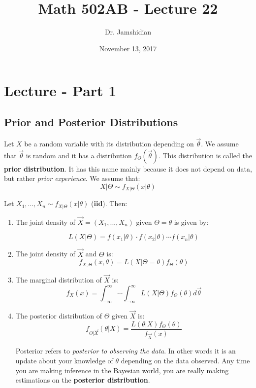 \documentclass{article}
\title{Math 502AB - Lecture 22}
\author{Dr. Jamshidian}
\date{November 13, 2017}
\begin{document}
\maketitle

\section{Lecture - Part 1}

\subsection{Prior and Posterior Distributions}

Let $X$ be a random variable with its distribution depending on $\vec{\theta}$. We assume that $\vec{\theta}$ is random and it has a distribution $f_{\Theta}(\vec{\theta})$. This distribution is called the \textbf{prior distribution}. It has this name mainly because it does not depend on data, but rather \textit{prior experience}. We assume that:
\begin{equation*}
    X|\Theta \sim f_{X|\Theta}(x|\theta)
\end{equation*}

\noindent Let $X_1,...,X_n\sim f_{X|\Theta}(x|\theta)$ (\textbf{iid}). Then:
\begin{enumerate}
    \item The joint density of $\vec{X} = (X_1,...,X_n)$ given $\Theta = \theta$ is given by:

\begin{equation*}
    L(X|\Theta) = f(x_1|\theta)\cdot f(x_2|\theta)\cdots f(x_n|\theta)
\end{equation*}

    \item The joint density of $\vec{X}$ and $\Theta$ is:
        \begin{equation*}
            f_{X,\Theta}(x,\theta) = L(X|\Theta = \theta)f_\Theta(\theta)
        \end{equation*}

    \item The marginal distribution of $\vec{X}$ is:
    \begin{equation*}
        f_X(x) = \int_{-\infty}^\infty\cdots\int_{-\infty}^\infty L(X|\Theta)f_\Theta(\theta) d\vec{\theta}
    \end{equation*}

    \item The posterior distribution of $\Theta$ given $\vec{X}$ is:
    \begin{equation*}
        f_{\Theta|\vec{X}}(\theta|X) = \frac{L(\theta|X)f_\Theta(\theta)}{f_{\vec{X}}(x)}
    \end{equation*}

    Posterior refers to \textit{posterior to observing the data}. In other words it is an update about your knowledge of $\theta$ depending on the data observed. Any time you are making inference in the Bayesian world, you are really making estimations on the \textbf{posterior distribution}.
\end{enumerate}
\end{document}
